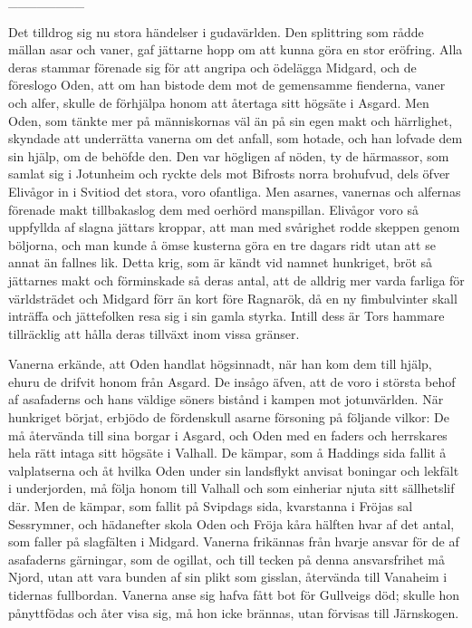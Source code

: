 {\_\_\_\_\_\_\_\_}

Det tilldrog sig nu stora händelser i gudavärlden. Den splittring som
rådde mällan asar och vaner, gaf jättarne hopp om att kunna göra en stor
eröfring. Alla deras stammar förenade sig för att angripa och ödelägga
Midgard, och de föreslogo Oden, att om han bistode dem mot de gemensamme
fienderna, vaner och alfer, skulle de förhjälpa honom att återtaga sitt
högsäte i Asgard. Men Oden, som tänkte mer på människornas väl än på sin
egen makt och härrlighet, skyndade att underrätta vanerna om det anfall,
som hotade, och
\protect\hypertarget{lb1625905.xhtmlux5cux23start163}{}{}\protect\hypertarget{lb1625905.xhtmlux5cux23start163-a}{}{}\protect\hypertarget{lb1625905.xhtmlux5cux23start163-b}{}{}\protect\hypertarget{lb1625905.xhtmlux5cux23start163-c}{}{}\protect\hypertarget{lb1625905.xhtmlux5cux23start163-d}{}{}
han lofvade dem sin hjälp, om de behöfde den. Den var högligen af nöden,
ty de härmassor, som samlat sig i Jotunheim och ryckte dels mot Bifrosts
norra brohufvud, dels öfver Elivågor in i Svitiod det stora, voro
ofantliga. Men asarnes, vanernas och alfernas förenade makt tillbakaslog
dem med oerhörd manspillan. Elivågor voro så uppfyllda af slagna jättars
kroppar, att man med svårighet rodde skeppen genom böljorna, och man
kunde å ömse kusterna göra en tre dagars ridt utan att se annat än
fallnes lik. Detta krig, som är kändt vid namnet hunkriget, bröt så
jättarnes makt och förminskade så deras antal, att de alldrig mer varda
farliga för världsträdet och Midgard förr än kort före Ragnarök, då en
ny fimbulvinter skall inträffa och jättefolken resa sig i sin gamla
styrka. Intill dess är Tors hammare tillräcklig att hålla deras tillväxt
inom vissa gränser.

Vanerna erkände, att Oden handlat högsinnadt, när han kom dem till
hjälp, ehuru de drifvit honom från Asgard. De insågo äfven, att de voro
i största behof af asafaderns och hans väldige söners bistånd i kampen
mot jotunvärlden. När hunkriget börjat, erbjödo de fördenskull asarne
försoning på följande vilkor: De må återvända till sina borgar i Asgard,
och Oden med en faders och herrskares hela rätt intaga sitt högsäte i
Valhall. De kämpar, som å Haddings sida fallit å valplatserna och åt
hvilka Oden under sin landsflykt anvisat boningar och lekfält i
underjorden, må följa honom till Valhall och som einheriar njuta sitt
sällhetslif där. Men de kämpar, som fallit på Svipdags sida, kvarstanna
i Fröjas sal Sessrymner, och hädanefter skola Oden och Fröja kåra
hälften hvar af det antal, som faller på slagfälten i Midgard. Vanerna
frikännas från hvarje ansvar för de af asafaderns gärningar, som de
ogillat, och till tecken på denna ansvarsfrihet må Njord, utan att vara
bunden af sin plikt som gisslan, återvända till Vanaheim i tidernas
fullbordan. Vanerna anse sig hafva fått bot för Gullveigs död; skulle
hon pånyttfödas och åter visa sig, må hon icke brännas, utan förvisas
till Järnskogen.


